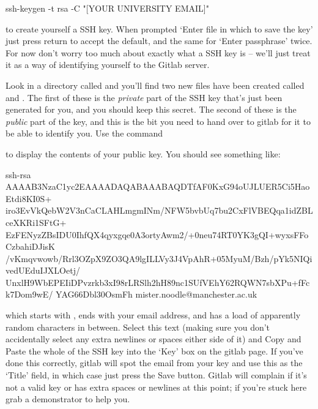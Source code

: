 \begin{ttoutenv}
ssh-keygen -t rsa -C "[YOUR UNIVERSITY EMAIL]"
\end{ttoutenv}

to create yourself a SSH key. When prompted `Enter file in which to save the key' just press return to accept the default, and the same for `Enter passphrase' twice.  For now don't worry too much about exactly what a SSH key is -- we'll just treat it as a way of identifying yourself to the Gitlab server. 

Look in a directory called  and you'll find two new files have been created called  and . The first of these is the \textit{private} part of the SSH key that's just been generated for you, and you should keep this secret. The second of these is the \textit{public} part of the key, and this is the bit you need to hand over to gitlab for it to be able to identify you. Use the command

to display the contents of your public key. You should see something like:

\begin{ttoutenv}
  
  ssh-rsa  AAAAB3NzaC1yc2EAAAADAQABAAABAQDTfAF0KxG94oUJLUER5Ci5HaoEtdi8KI0S+
  iro3EvVkQebW2V3nCaCLAHLmgmINm/NFW5bvbUq7bu2CxFlVBEQqa1idZBLceXKRi1SFtG+
  EzFENyzZBsIDU0IhfQX4qyxgqe0A3ortyAwm2/+0neu74RT0YK3gQI+wyxsFFoCzbahiDJisK
  /vKmqvwowb/Rrl3OZpX9ZO3QA9lgILLVy3J4VpAhR+05MyuM/Bzh/pYk5NIQivedUEduIJXLOetj/
  UnxlH9WbEPEIiDPvzrkb3xI98rLRSlh2hH89nc1SUfVEhY62RQWN7sbXPu+fFck7Dom9wE/
  YAG66Dbl30OsmFh mister.noodle@manchester.ac.uk

\end{ttoutenv}


which starts with , ends with your email address, and has a load of apparently random characters in between. Select this text (making sure you don't accidentally select any extra newlines or spaces either side of it) and 
Copy and Paste the whole of the SSH key into the `Key' box on the gitlab page. If you've done this correctly, gitlab will spot the email from your key and use this as the `Title' field, in which case just press the Save button. Gitlab will complain if it's not a valid key or has extra spaces or newlines at this point; if you're stuck here grab a demonstrator to help you. 

